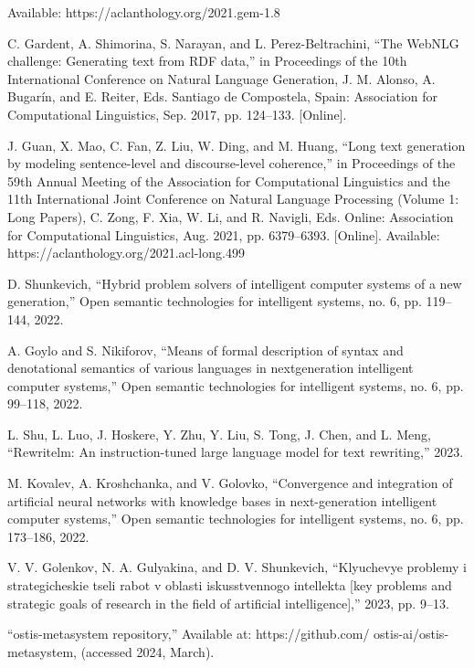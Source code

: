 \documentclass[a4paper]{article}
\begin{document}
\begin{multicols}{2}
\begin{thebiblieography}
Available: https://aclanthology.org/2021.gem-1.8\par
\cite{12} C. Gardent, A. Shimorina, S. Narayan, and L. Perez-Beltrachini,
“The WebNLG challenge: Generating text from RDF data,”
in Proceedings of the 10th International Conference on
Natural Language Generation, J. M. Alonso, A. Bugarín, and
E. Reiter, Eds. Santiago de Compostela, Spain: Association for
Computational Linguistics, Sep. 2017, pp. 124–133. [Online].\par
\cite{13} J. Guan, X. Mao, C. Fan, Z. Liu, W. Ding, and M. Huang, “Long
text generation by modeling sentence-level and discourse-level
coherence,” in Proceedings of the 59th Annual Meeting of
the Association for Computational Linguistics and the 11th
International Joint Conference on Natural Language Processing
(Volume 1: Long Papers), C. Zong, F. Xia, W. Li, and
R. Navigli, Eds. Online: Association for Computational
Linguistics, Aug. 2021, pp. 6379–6393. [Online]. Available:
https://aclanthology.org/2021.acl-long.499\par
\cite{14} D. Shunkevich, “Hybrid problem solvers of intelligent computer
systems of a new generation,” Open semantic technologies for
intelligent systems, no. 6, pp. 119–144, 2022.\par
\cite{15} A. Goylo and S. Nikiforov, “Means of formal description of
syntax and denotational semantics of various languages in nextgeneration intelligent computer systems,” Open semantic technologies for intelligent systems, no. 6, pp. 99–118, 2022.\par
\cite{16} L. Shu, L. Luo, J. Hoskere, Y. Zhu, Y. Liu, S. Tong, J. Chen, and
L. Meng, “Rewritelm: An instruction-tuned large language model
for text rewriting,” 2023.\par
\cite{17} M. Kovalev, A. Kroshchanka, and V. Golovko, “Convergence and
integration of artificial neural networks with knowledge bases
in next-generation intelligent computer systems,” Open semantic
technologies for intelligent systems, no. 6, pp. 173–186, 2022.\par
\cite{18} V. V. Golenkov, N. A. Gulyakina, and D. V. Shunkevich,
“Klyuchevye problemy i strategicheskie tseli rabot v oblasti
iskusstvennogo intellekta [key problems and strategic goals of
research in the field of artificial intelligence],” 2023, pp. 9–13.\par
\cite{19} “ostis-metasystem repository,” Available at: https://github.com/
ostis-ai/ostis-metasystem, (accessed 2024, March).

\columnbreak




\end{thebiblieography}
\end{multicols}
\end{document}
